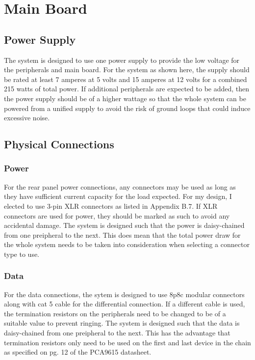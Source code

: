 \documentclass{book}
\begin{document}
\chapter{Main Board}
\section{Power Supply}
The system is designed to use one power supply to provide the low voltage for the peripherals and main board. For the system as shown here, the supply 
should be rated at least 7 amperes at 5 volts and 15 amperes at 12 volts for a combined 215 watts of total power. If additional peripherals are expected to 
be added, then the power supply should be of a higher wattage so that the whole system can be powered from a unified supply to avoid the risk of ground 
loops that could induce excessive noise.

\section{Physical Connections}
\subsection{Power}
For the rear panel power connections, any connectors may be used as long as they have sufficient current capacity for the load expected. For my design, I 
elected to use 3-pin XLR connectors as listed in Appendix B.7. If XLR connectors are used for power, they should be marked as such to avoid any 
accidental damage. The system is designed such that the power is daisy-chained from one preipheral to the next. This does mean that the total power 
draw for the whole system needs to be taken into consideration when selecting a connector type to use.

\subsection{Data}
For the data connections, the sytem is designed to use 8p8c modular connectors along with cat 5 cable for the differential connection. If a different cable is 
used, the termination resistors on the peripherals need to be changed to be of a suitable value to prevent ringing. The system is designed such that the 
data is daisy-chained from one preipheral to the next. This has the advantage that termination resistors only need to be used on the first and last device in 
the chain as specified on pg. 12 of the PCA9615 datasheet\cite{nxp:pca9615}.
\end{document}
